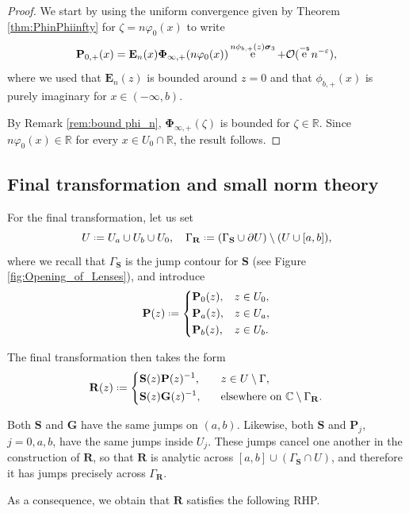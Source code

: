 \documentclass[reqno,a4paper,11pt]{amsart}
\DeclareMathOperator{\ee}{\rm e}
\newcommand{\C}{\mathbb{C}}
\newcommand{\R}{\mathbb{R}}
\newcommand{\Boh}{\mathcal{O}}
\newcommand*{\deff}{\mathrel{\vcenter{\baselineskip0.5ex \lineskiplimit0pt
                     \hbox{\scriptsize.}\hbox{\scriptsize.}}}%
                     =}
\renewcommand{\bm}{\mathbf}
\newcommand{\msf}{\mathsf}
\renewcommand{\sp}{\boldsymbol \sigma}
\newcommand{\sad}{\msf s}
\theoremstyle{definition}
\theoremstyle{remark}
\numberwithin{equation}{section}
\begin{document}
\begin{proof}
    We start by using the uniform convergence given by Theorem \ref{thm:PhinPhiinfty} for $\zeta = n \varphi_0(x)$ to write
    \[
        \bm P_{0,+}(x) = \bm E_n(x) \bm \Phi_{\infty,+}( n \varphi_{0}(x)) \ee^{n \phi_{b,+}(z) \sp_3} + \Boh(\ee^{- \sad }n^{- \varepsilon}),
    \]
    where we used that $\bm E_n(z)$ is bounded around $z=0$ and that $\phi_{b,+}(x)$ is purely imaginary for $x \in (-\infty, b)$. 
    
    By Remark \ref{rem:bound phi_n}, $\bm \Phi_{\infty,+}(\zeta)$ is bounded for $ \zeta \in \R$. Since $n \varphi_0(x) \in \R$ for every $x \in U_0 \cap \R$, the result follows.
\end{proof}

\subsection{Final transformation and small norm theory}\hfill 

For the final transformation, let us set
%
$$
U\deff U_a\cup U_b\cup U_0,\quad \Gamma_{\bm R}\deff (\Gamma_{\bm S}\cup \partial U)\setminus ( U\cup [a,b]),
$$
%
where we recall that $\Gamma_{\bm S}$ is the jump contour for $\bm S$ (see Figure \ref{fig:Opening_of_Lenses}),
and introduce 
%
\begin{equation}\label{deff:PPoPaPb}
\bm P(z)\deff 
\begin{dcases}
    \bm P_0(z),& z\in U_0, \\ 
    \bm P_a(z), & z\in U_a, \\ 
    \bm P_b(z), & z\in U_b.
\end{dcases}
\end{equation}

The final transformation then takes the form
%
\[
    \bm R(z) \deff \begin{dcases}
        \bm S(z) \bm P(z)^{-1}, \quad &z \in U\setminus \Gamma, \\
        \bm S(z) \bm G(z)^{-1}, &\text{elsewhere on }\C\setminus \Gamma_{\bm R}.
    \end{dcases}
\]

Both $\bm S$ and $\bm G$ have the same jumps on $(a,b)$. Likewise, both $\bm S$ and $\bm P_j$, $j=0,a,b$, have the same jumps inside $U_j$. These jumps cancel one another in the construction of $\bm R$, so that $\bm R$ is analytic across $[a,b]\cup (\Gamma_{\bm S} \cap U)$, and therefore it has jumps precisely across $\Gamma_{\bm R}$.

As a consequence, we obtain that $\bm R$ satisfies the following RHP.
\end{document}
